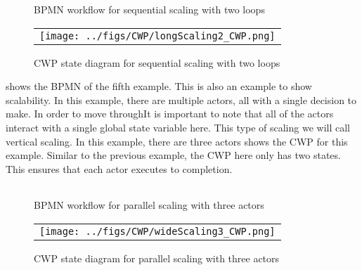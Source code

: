 \begin{figure*}[t]
  \begin{center}
    \begin{tabular}{c}
        
    \end{tabular}
  \end{center}
\caption{BPMN workflow for sequential scaling with two loops}
\label{fig:longScaling2_bpmn}
\end{figure*}

\begin{figure*}[t]
  \begin{center}
    \begin{tabular}{c}
        \texttt{[image: ../figs/CWP/longScaling2\_CWP.png]}
    \end{tabular}
  \end{center}
\caption{CWP state diagram for sequential scaling with two loops}
\label{fig:longScaling2_cwp}
\end{figure*}

 shows the BPMN of the fifth example. This is also an example to show scalability. In this example, there are multiple actors, all with a single decision to make. In order to move throughIt is important to note that all of the actors interact with a single global state variable here. This type of scaling we will call vertical scaling. In this example, there are three actors  shows the CWP for this example. Similar to the previous example, the CWP here only has two states. This ensures that each actor executes to completion.

\begin{figure*}[t]
  \begin{center}
    \begin{tabular}{c}
        
    \end{tabular}
  \end{center}
\caption{BPMN workflow for parallel scaling with three actors}
\label{fig:wideScaling3_bpmn}
\end{figure*}

\begin{figure*}[t]
  \begin{center}
    \begin{tabular}{c}
        \texttt{[image: ../figs/CWP/wideScaling3\_CWP.png]}
    \end{tabular}
  \end{center}
\caption{CWP state diagram for parallel scaling with three actors}
\label{fig:wideScaling3_cwp}
\end{figure*}

